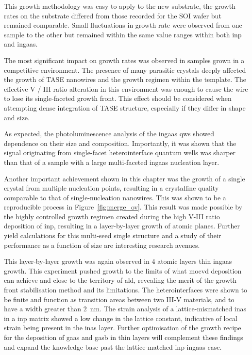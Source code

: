 This growth methodology was easy to apply to the new substrate, the growth rates on the  substrate differed from those recorded for the  \acs{SOI} wafer but remained comparable. Small fluctuations in growth rate were observed from one sample to the other but remained within the same value ranges within both \acs{inp} and \acs{ingaas}. 

The most significant impact on growth rates was observed in samples grown in a competitive environment. The presence of many parasitic crystals deeply affected the growth of \acs{TASE} nanowires and the growth regimen within the template. The effective V / III ratio alteration in this environment was enough to cause the wire to lose its single-faceted growth front. This effect should be considered when attempting dense integration of \acs{TASE} structure, especially if they differ in shape and size.

As expected, the photoluminescence analysis of the \acs{ingaas} \acs{qw}s showed dependence on their size and composition. Importantly, it was shown that the signal originating from  single-facet heterointerface quantum wells was sharper than that of a sample with a large multi-faceted \acs{ingaas} nucleation layer.

Another important achievement shown in this chapter was the growth of a single crystal from multiple nucleation points, resulting in a crystalline quality comparable to that of single-nucleation nanowires. This was shown to be a reproducible process in Figure~\ref{fig:merge_ov}. This result was made possible by the highly controlled growth regimen created during the high V-III ratio deposition of \acs{inp}, resulting in a layer-by-layer growth of  atomic planes. Further yield calculations for this multi-seed single structure and a study of their performance as a function of size are interesting research avenues. 

This layer-by-layer growth was again observed in 4 atomic layers thin \acs{ingaas} growth. This experiment pushed growth to the limits of what \acs{mocvd} deposition can achieve and close to the territory of \acs{ald}, revealing the merit of the growth front stabilisation method and its limitations. The heterointerfaces were shown to be finite and function as transition areas between two III-V materials, and to have a width greater than \qty{2}{\nano\metre}. The strain analysis of a lattice-mismatched \acs{inas} in a \acs{inp} matrix showed a low change in the lattice constant, indicative of local strain being present in the \acs{inas} layer. Further optimisation of the growth recipe for the deposition of \acs{gaas} and \acs{gasb} in thin layers will complement these findings and expand the knowledge base past the lattice-matched \acs{inp}-\acs{ingaas} case.

